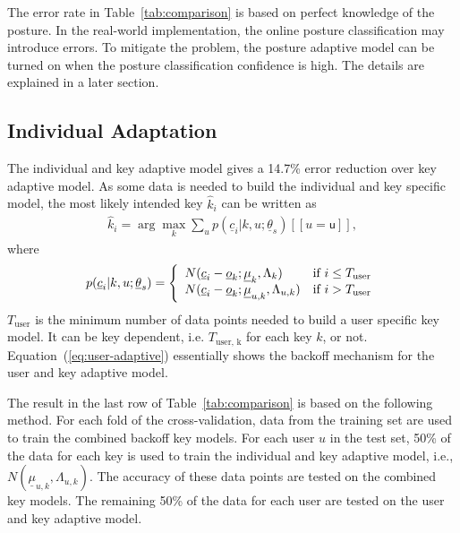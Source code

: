 \documentclass{sigchi}
\begin{document}
The error rate in Table~\ref{tab:comparison} is based on perfect knowledge of
the posture. In the real-world implementation, the online posture classification may
introduce errors. To mitigate the problem, the posture adaptive model can be turned on
when the posture classification confidence is high. The details are explained in a later section.

\subsection{Individual Adaptation}
The individual and key adaptive model gives a 14.7\% error reduction over key adaptive model. As some data is needed to build the individual and key specific model, the most likely intended key $\hat k_i$ can be written as
\begin{align}          
\hat k_i = \arg\max_k \sum_{u} p(\underline c_i | k, u; \underline\theta_s)[[u = \textsf{u}]],
\end{align}
where
\begin{align}
p(\underline c_i | k, u; \underline\theta_s) = \left\{
  \begin{array}{l l}
  N(\underline c_i - \underline o_k; \underline \mu_{k}, \Lambda_{k}) & \text{if $i \le T_\text{user}$} \\
  N(\underline c_i -  \underline o_k; \underline \mu_{u, k}, \Lambda_{u, k}) & \text{if $i >T_\text{user}$} \\
\end{array} \right. \label{eq:user-adaptive}
\end{align}
$T_\text{user}$ is the minimum number of data points needed to build a user specific key model. 
It can be key dependent, i.e. $T_\text{user, k}$ for each key $k$, or not. Equation~(\ref{eq:user-adaptive}) 
essentially shows the backoff mechanism for the user and key adaptive model.

The result in the last row of Table~\ref{tab:comparison} is based on the 
following method. For each fold of the cross-validation, data from the training set are used to 
train the combined backoff key models. For each user $u$ in the test set,
50\% of the data for each key is used to train the individual and key adaptive
model, i.e., $N(\underline \mu_{u, k}, \Lambda_{u, k})$.
The accuracy of these data points are tested on the combined key models.
The remaining 50\% of the data for each user are tested on the user and key adaptive 
model. 
\end{document}
